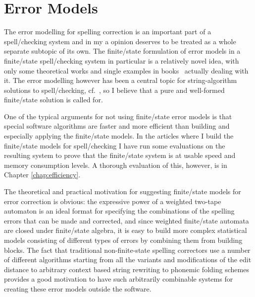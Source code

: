 \documentclass[officiallayout]{unihelcompling}
\begin{document}
\chapter{Error Models}
\label{chap:error-models}

The error modelling for spelling correction is an important part of a
spell\-/checking system and in my a opinion deserves to be treated as a whole
separate subtopic of its own. The finite\-/state formulation of error models in
a finite\-/state spell\-/checking system in particular is a relatively novel
idea, with only some theoretical works
\citep{agata2002typographical,mohri2003edit} and single examples in
books~\citep{beesley2003finite} actually dealing with it.  The error modelling
however has been a central topic for string-algorithm solutions to
spell\-/checking,
cf.~\citet{kukich1992spelling,mitton2009ordering,deorowicz2005correcting}, so I
believe that a pure and well-formed finite\-/state solution is called for.

One of the typical arguments for not using finite\-/state error models is that
special software algorithms are faster and more efficient than building and
especially applying the finite\-/state models. In the articles where I build
the finite\-/state models for spell\-/checking I have run some evaluations on
the resulting system to prove that the finite\-/state system is at usable speed
and memory consumption levels. A thorough evaluation of this, however, is in
Chapter \ref{chap:efficiency}.

The theoretical and practical motivation for suggesting finite\-/state models
for error correction is obvious: the expressive power of a weighted two-tape
automaton is an ideal format for specifying the combinations of the spelling
errors that can be made and corrected, and since weighted finite\-/state
automata are closed under finite\-/state algebra, it is easy to build more complex statistical models consisting of different types of
errors by combining them from building blocks. The fact that traditional
non-finite-state spelling correctors use a number of different algorithms
starting from all the variants and modifications of the edit distance to
arbitrary context based string rewriting to phonemic folding schemes provides a
good motivation to have such arbitrarily combinable systems for creating these
error models outside the software.
\end{document}
